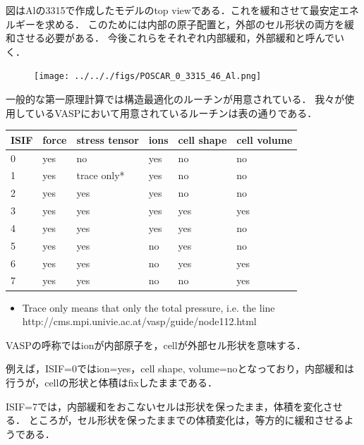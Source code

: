図はAlの3315で作成したモデルのtop
viewである．これを緩和させて最安定エネルギーを求める．
このためには内部の原子配置と，外部のセル形状の両方を緩和させる必要がある．
今後これらをそれぞれ内部緩和，外部緩和と呼んでいく．

\begin{figure}[H]
\centering
\begin{center}
\texttt{[image: ../.././figs/POSCAR\_0\_3315\_46\_Al.png]}
\end{center}
\caption{{}}

\label{fig:This}
\end{figure}

一般的な第一原理計算では構造最適化のルーチンが用意されている．
我々が使用しているVASPにおいて用意されているルーチンは表の通りである．

\begin{longtable}[]{@{}llllll@{}}
\toprule
ISIF & force & stress tensor & ions & cell shape & cell
volume\tabularnewline
\midrule
\endhead
0 & yes & no & yes & no & no\tabularnewline
1 & yes & trace only* & yes & no & no\tabularnewline
2 & yes & yes & yes & no & no\tabularnewline
3 & yes & yes & yes & yes & yes\tabularnewline
4 & yes & yes & yes & yes & no\tabularnewline
5 & yes & yes & no & yes & no\tabularnewline
6 & yes & yes & no & yes & yes\tabularnewline
7 & yes & yes & no & no & yes\tabularnewline
\bottomrule
\end{longtable}

\begin{itemize}
\tightlist
\item
  Trace only means that only the total pressure, i.e. the line
  http://cms.mpi.univie.ac.at/vasp/guide/node112.html
\end{itemize}

VASPの呼称ではionが内部原子を，cellが外部セル形状を意味する．

例えば，ISIF=0ではion=yes，cell shape,
volume=noとなっており，内部緩和は行うが，cellの形状と体積はfixしたままである．

ISIF=7では，内部緩和をおこないセルは形状を保ったまま，体積を変化させる．
ところが，セル形状を保ったままでの体積変化は，等方的に緩和させるようである．


